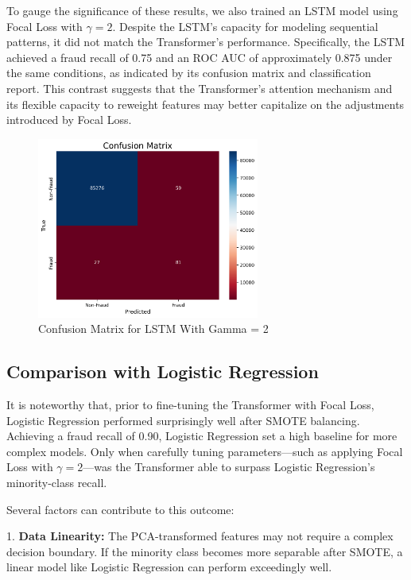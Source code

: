 \documentclass[11pt, oneside]{article}   	%
\begin{document}
To gauge the significance of these results, we also trained an LSTM model using Focal Loss with \(\gamma = 2\). Despite the LSTM’s capacity for modeling sequential patterns, it did not match the Transformer's performance. Specifically, the LSTM achieved a fraud recall of 0.75 and an ROC AUC of approximately 0.875 under the same conditions, as indicated by its confusion matrix and classification report. This contrast suggests that the Transformer's attention mechanism and its flexible capacity to reweight features may better capitalize on the adjustments introduced by Focal Loss.

\begin{figure}[H]
    \centering
    \includegraphics[width=0.65\textwidth]{images/confusion_matrix_lstm_2.png}
    \caption{Confusion Matrix for LSTM With Gamma = 2}
    \label{fig:confusion_matrix_lstm_2}
\end{figure}

\subsection{Comparison with Logistic Regression}

It is noteworthy that, prior to fine-tuning the Transformer with Focal Loss, Logistic Regression performed surprisingly well after SMOTE balancing. Achieving a fraud recall of 0.90, Logistic Regression set a high baseline for more complex models. Only when carefully tuning parameters—such as applying Focal Loss with \(\gamma = 2\)—was the Transformer able to surpass Logistic Regression’s minority-class recall.

Several factors can contribute to this outcome:

1. \textbf{Data Linearity:} The PCA-transformed features may not require a complex decision boundary. If the minority class becomes more separable after SMOTE, a linear model like Logistic Regression can perform exceedingly well.
\end{document}
